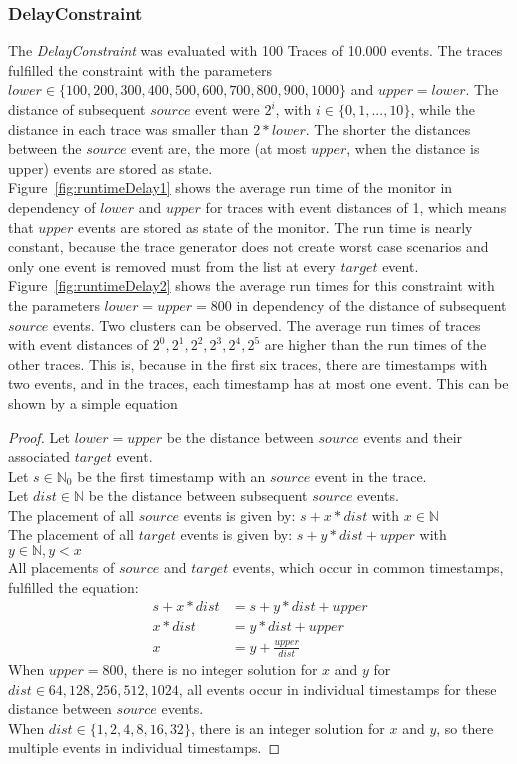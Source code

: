 \subsubsection{DelayConstraint}
	The \textit{DelayConstraint} was evaluated with 100 Traces of 10.000 events. The traces fulfilled the constraint with the parameters $lower\in\{100, 200, 300, 400, 500, 600, 700, 800, 900, 1000\}$ and $upper=lower$.  The distance of subsequent $source$ event were $2^i$, with $i\in \{0, 1, ..., 10\}$, while the distance in each trace was smaller than $2*lower$. The shorter the distances between the $source$ event are, the more (at most $upper$, when the distance is upper) events are stored as state.\\
	Figure~\ref{fig:runtimeDelay1} shows the average run time of the monitor in dependency of $lower$ and $upper$ for traces with event distances of 1, which means that $upper$ events are stored as state of the monitor. The run time is nearly constant, because the trace generator does not create worst case scenarios and only one event is removed must from the list at every $target$ event.\\
	Figure~\ref{fig:runtimeDelay2} shows the average run times for this constraint with the parameters $lower=upper=800$ in dependency of the distance of subsequent $source$ events. Two clusters can be observed. The average run times of traces with event distances of $2^0, 2^1,2^2,2^3,2^4,2^5$ are higher than the run times of the other traces. This is, because in the first six traces, there are timestamps with two events, and in the traces, each timestamp has at most one event. This can be shown by a simple equation
	\begin{proof}
		Let $lower=upper$ be the distance between $source$ events and their associated $target$ event.\\
		Let $s\in\mathbb{N}_0$ be the first timestamp with an $source$ event in the trace.\\
		Let $dist\in\mathbb{N}$ be the distance between subsequent $source$ events.\\
		The placement of all $source$ events is given by: $s+x*dist$ with $x\in\mathbb N$\\
		The placement of all $target$ events is given by: $s+y*dist + upper$ with $y\in\mathbb N, y<x$\\
		All placements of $source$ and $target$ events, which occur in common timestamps, fulfilled the equation:\\
		\begin{align}
			s+x*dist&=s+y*dist+upper\\
			x*dist&=y*dist+upper\\
			x&= y + \frac{upper}{dist}
		\end{align}
		When $upper=800$, there is no integer solution for $x$ and $y$ for $dist\in{64,128,256,512,1024}$, all events occur in individual timestamps for these distance between $source$ events.\\
		When $dist\in\{1,2,4,8,16,32\}$, there is an integer solution for $x$ and $y$, so there multiple events in individual timestamps.
	\end{proof}
